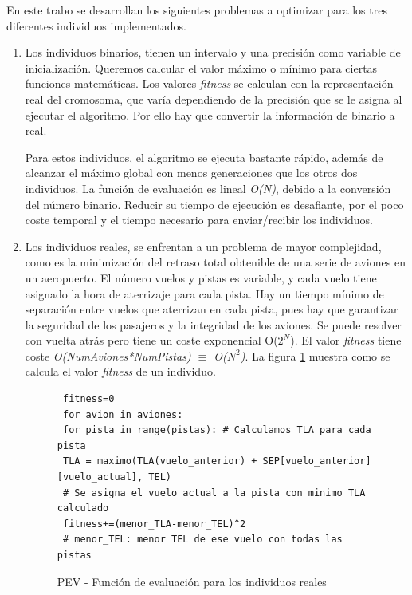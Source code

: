 	\begin{flushleft}
		En este trabo se desarrollan los siguientes problemas a optimizar para los tres diferentes individuos implementados.
	\end{flushleft}
	\begin{enumerate}
		\item Los individuos binarios, tienen un intervalo y una precisión como variable de inicialización. Queremos calcular el valor máximo o mínimo para ciertas funciones matemáticas. Los valores \textit{fitness} se calculan con la representación real del cromosoma, que varía dependiendo de la precisión que se le asigna al ejecutar el algoritmo. Por ello hay que convertir la información de binario a real. 
		
		Para estos individuos, el algoritmo se ejecuta bastante rápido, además de alcanzar el máximo global con menos generaciones que los otros dos individuos. La función de evaluación es lineal \textit{O(N)}, debido a la conversión del número binario. Reducir su tiempo de ejecución es desafiante, por el poco coste temporal y el tiempo necesario para enviar/recibir los individuos.		
		\item Los individuos reales, se enfrentan a un problema de mayor complejidad, como es la minimización del retraso total obtenible de una serie de aviones en un aeropuerto. El número vuelos y pistas es variable, y cada vuelo tiene asignado la hora de aterrizaje para cada pista. Hay un tiempo mínimo de separación entre vuelos que aterrizan en cada pista, pues hay que garantizar la seguridad de los pasajeros y la integridad de los aviones. Se puede resolver con vuelta atrás pero tiene un coste exponencial O(\(2^{N}\)). El valor \textit{fitness} tiene coste \textit{O(NumAviones*NumPistas) $\equiv$ O(\(N^{2}\))}. La figura \ref{fig:pev_funcion_ev_2} muestra como se calcula el valor \textit{fitness} de un individuo.
		
		\begin{figure}
		
		
			\begin{lstlisting}
 fitness=0
 for avion in aviones:
 for pista in range(pistas): # Calculamos TLA para cada pista
 TLA = maximo(TLA(vuelo_anterior) + SEP[vuelo_anterior][vuelo_actual], TEL)
 # Se asigna el vuelo actual a la pista con minimo TLA calculado
 fitness+=(menor_TLA-menor_TEL)^2
 # menor_TEL: menor TEL de ese vuelo con todas las pistas		
			\end{lstlisting}
			\caption{PEV - Función de evaluación para los individuos reales}
			\label{fig:pev_funcion_ev_2}
		\end{figure}
		

\end{enumerate}
